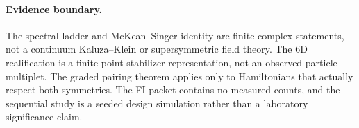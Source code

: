 \paragraph{Evidence boundary.}
The spectral ladder and McKean--Singer identity are finite-complex statements,
not a continuum Kaluza--Klein or supersymmetric field theory.  The $6$D
realification is a finite point-stabilizer representation, not an observed
particle multiplet.  The graded pairing theorem applies only to Hamiltonians
that actually respect both symmetries.  The FI packet contains no measured
counts, and the sequential study is a seeded design simulation rather than a
laboratory significance claim.
